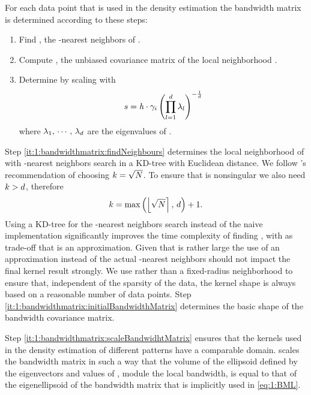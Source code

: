 	For each data point \varPattern[\itXis] that is used in the density estimation the bandwidth matrix is determined according to these steps:
		\begin{enumerate}[labelindent=0ex]
			\item \label{it:1:bandwidthmatrix:findNeighbours}
				Find \varNeighborhood{\varPattern[\itXis]}, the \KNNK-nearest neighbors of \varPattern[\itXis].
			\item \label{it:1:bandwidthmatrix:initialBandwidthMatrix}
				Compute \varCovarianceMatrix, the unbiased covariance matrix of the local neighborhood \varNeighborhood{\varPattern[\itXis]}.
			\item \label{it:1:bandwidthmatrix:scaleBandwidhtMatrix}
				Determine \varBandwidthMatrix[\itXis] by scaling \varCovarianceMatrix with
				\begin{equation}\label{eq:method:scalingFactor}
					s = \mathit{h} \cdot \gamma_{i} 
				 \left( \displaystyle\prod_{l = 1}^{d} \lambda_{l} \right)^{-\frac{1}{d}}
				\end{equation}
				where $\lambda_1,\, \cdots,\, \lambda_d$ are the eigenvalues of \varCovarianceMatrix.  
		\end{enumerate}	
			Step \ref{it:1:bandwidthmatrix:findNeighbours} determines the local neighborhood of \varPattern[\itXis] with \KNNK-nearest neighbors search in a KD-tree \cite{Bentley1975Multidimensional} with Euclidean distance. 
			We follow \citeauthor{silverman1986density}'s \cite{silverman1986density} recommendation of choosing $k = \sqrt{N}$. To ensure that \varCovarianceMatrix is nonsingular we also need $k > d$, therefore
			\begin{equation*}
				k = \max\left(\left\lfloor \sqrt{N} \right\rceil,\, d \right) + 1.	
			\end{equation*}			
			Using a KD-tree for the \KNNK-nearest neighbors search instead of the naive implementation significantly improves the time complexity of finding \varBandwidthMatrix[\itXis], with  as trade-off that \varNeighborhood{\varPattern[\itXis]} is an approximation. Given that \KNNK is rather large the use of an approximation instead of the actual \KNNK-nearest neighbors should not impact the final kernel result strongly. 
			We use \KNN rather than a fixed-radius neighborhood to ensure that, independent of the sparsity of the data, the kernel shape is always based on a reasonable number of data points. 
			Step \ref{it:1:bandwidthmatrix:initialBandwidthMatrix} determines the basic shape of the bandwidth covariance matrix. 

			Step \ref{it:1:bandwidthmatrix:scaleBandwidhtMatrix} ensures that the kernels used in the density estimation of different patterns have a comparable domain.  scales the bandwidth matrix in such a way that the volume of the ellipsoid defined by the eigenvectors and values of \varBandwidthMatrix[\itXis], module the local bandwidth, is equal to that of the eigenellipsoid of the bandwidth matrix that is implicitly used in \cref{eq:1:BML}.